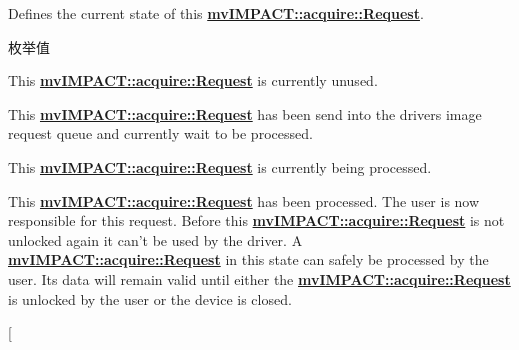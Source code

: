 Defines the current state of this {\bfseries \hyperlink{classmv_i_m_p_a_c_t_1_1acquire_1_1_request}{mv\+I\+M\+P\+A\+C\+T\+::acquire\+::\+Request}}. 

\begin{Desc}
\item[枚举值]\par
\begin{description}
\item[{\em 
\hypertarget{group___common_interface_ggacaa15d9102d56c38e659c31c678a640da5579117f3cb28fd420e1965edb91f550}{rs\+Idle}\label{group___common_interface_ggacaa15d9102d56c38e659c31c678a640da5579117f3cb28fd420e1965edb91f550}
}]This {\bfseries \hyperlink{classmv_i_m_p_a_c_t_1_1acquire_1_1_request}{mv\+I\+M\+P\+A\+C\+T\+::acquire\+::\+Request}} is currently unused. \item[{\em 
\hypertarget{group___common_interface_ggacaa15d9102d56c38e659c31c678a640daced8879b4e232a0d1d6f12b9e8c0cacf}{rs\+Waiting}\label{group___common_interface_ggacaa15d9102d56c38e659c31c678a640daced8879b4e232a0d1d6f12b9e8c0cacf}
}]This {\bfseries \hyperlink{classmv_i_m_p_a_c_t_1_1acquire_1_1_request}{mv\+I\+M\+P\+A\+C\+T\+::acquire\+::\+Request}} has been send into the drivers image request queue and currently wait to be processed. \item[{\em 
\hypertarget{group___common_interface_ggacaa15d9102d56c38e659c31c678a640dac64dfa18417fa813f3871c8baeeca0be}{rs\+Capturing}\label{group___common_interface_ggacaa15d9102d56c38e659c31c678a640dac64dfa18417fa813f3871c8baeeca0be}
}]This {\bfseries \hyperlink{classmv_i_m_p_a_c_t_1_1acquire_1_1_request}{mv\+I\+M\+P\+A\+C\+T\+::acquire\+::\+Request}} is currently being processed. \item[{\em 
\hypertarget{group___common_interface_ggacaa15d9102d56c38e659c31c678a640da5943fdb71cf814c1e99c9c95184dc26a}{rs\+Ready}\label{group___common_interface_ggacaa15d9102d56c38e659c31c678a640da5943fdb71cf814c1e99c9c95184dc26a}
}]This {\bfseries \hyperlink{classmv_i_m_p_a_c_t_1_1acquire_1_1_request}{mv\+I\+M\+P\+A\+C\+T\+::acquire\+::\+Request}} has been processed. The user is now responsible for this request. Before this {\bfseries \hyperlink{classmv_i_m_p_a_c_t_1_1acquire_1_1_request}{mv\+I\+M\+P\+A\+C\+T\+::acquire\+::\+Request}} is not unlocked again it can't be used by the driver. A {\bfseries \hyperlink{classmv_i_m_p_a_c_t_1_1acquire_1_1_request}{mv\+I\+M\+P\+A\+C\+T\+::acquire\+::\+Request}} in this state can safely be processed by the user. Its data will remain valid until either the {\bfseries \hyperlink{classmv_i_m_p_a_c_t_1_1acquire_1_1_request}{mv\+I\+M\+P\+A\+C\+T\+::acquire\+::\+Request}} is unlocked by the user or the device is closed. \item[{\em 
}
\end{description}
\end{Desc}
